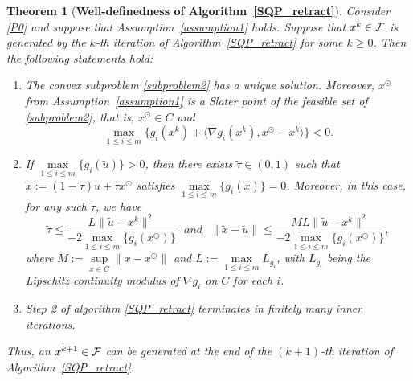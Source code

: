\documentclass[10pt]{article}
\numberwithin{equation}{section}
\newtheorem{theorem}{Theorem}[section]
\def\xfeas{x^\odot}
\begin{document}
\begin{theorem}[{{\bf Well-definedness of Algorithm~\ref{SQP_retract}}}]\label{welldef1}
Consider \eqref{P0} and suppose that Assumption~\ref{assumption1} holds. Suppose that $x^k\in {\cal F}$ is generated by the $k$-th iteration of Algorithm~\ref{SQP_retract} for some $k \ge 0$. Then the following statements hold:
\begin{enumerate}[{\rm (i)}]
   \item The convex subproblem \eqref{subproblem2} has a unique solution. Moreover, $\xfeas$ from Assumption~\ref{assumption1} is a Slater point of the feasible set of \eqref{subproblem2}, that is, $\xfeas\in C$ and $$\max\limits_{1 \le i \le m}\{g_i(x^k) + \langle \nabla g_i(x^k), \xfeas - x^k\rangle\} < 0.$$
   \item If $\max\limits_{1 \le i \le m} \{g_i(\widetilde{u})\} > 0$, then there exists $\widetilde{\tau}\in (0, 1)$ such that $\widetilde{x}:=(1 - \widetilde{\tau})\widetilde{u} + \widetilde{\tau} \xfeas$ satisfies $\max\limits_{1 \le i \le m} \{g_i(\widetilde{x})\} = 0$. Moreover, in this case, for any such $\widetilde\tau$, we have
       \begin{equation}\label{taubound0}
       \widetilde{\tau} \leq \frac{L\|\widetilde{u} - x^k\|^2}{-2\max\limits_{1 \le i \le m}\{g_i(\xfeas)\}}\ \ \ {and}\ \ \
       \|\widetilde{x} - \widetilde{u}\| \leq \frac{ML\|\widetilde{u} - x^k\|^2}{-2\max\limits_{1 \le i \le m}\{g_i(\xfeas)\}},
       \end{equation}
       where $M := \sup\limits_{x\in C}\|x - \xfeas\|$ and $L := \max\limits_{1 \le i \le m} L_{g_i}$, with $L_{g_i}$ being the Lipschitz continuity modulus of $\nabla g_i$ on $C$ for each $i$.
   \item Step 2 of algorithm \ref{SQP_retract} terminates in finitely many inner iterations.
 \end{enumerate}
 Thus, an $x^{k+1}\in {\cal F}$ can be generated at the end of the $(k+1)$-th iteration of Algorithm~\ref{SQP_retract}.
\end{theorem}
\end{document}
